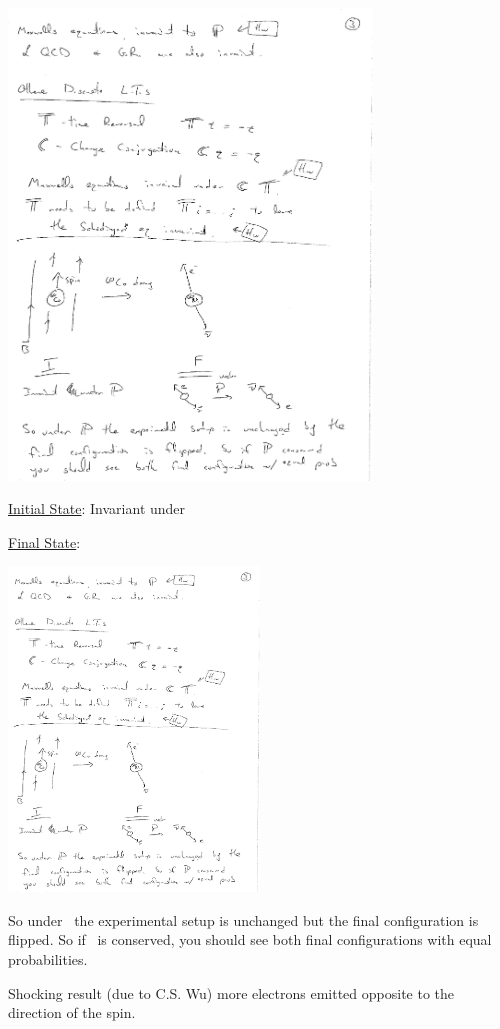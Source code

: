 {\bc
\includegraphics[width=0.725\textwidth]{./CobaltDecay.pdf}
\ec

\underline{Initial State}:  Invariant under \parity

\underline{Final State}:  

\bc
\includegraphics[width=0.5\textwidth]{./ParityOfCobaltDecay.pdf}
\ec

So under \parity\ the experimental setup is unchanged but the final configuration is flipped.
So if \parity\ is conserved, you should see both final configurations with equal probabilities.


Shocking result (due to C.S. Wu) more electrons emitted opposite to the direction of the spin. 

}
